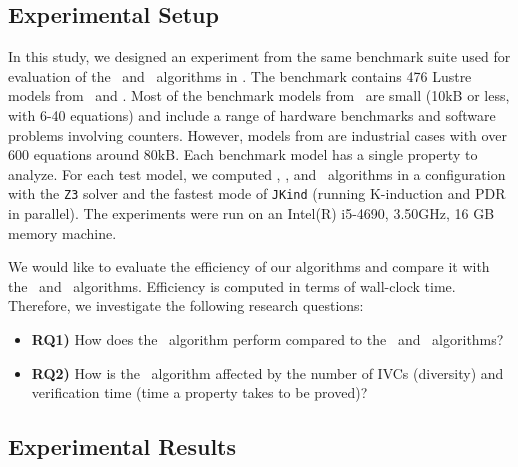 
\newcommand{\takeaway}[1]{
\vspace{6pt}
\noindent\fbox{\parbox{\textwidth}{#1}}
\vspace{6pt}
}
\subsection{Experimental Setup}
 In this study, we designed an experiment from
 the same benchmark suite used for evaluation of the \ucalg ~and \ucbfalg ~algorithms in \cite{Ghass16}.
 The benchmark contains 476 Lustre models
 from~\cite{Hagen08:FMCAD} and \cite{QFCS15:backes,hilt2013}.
 Most of
the benchmark models from~\cite{Hagen08:FMCAD} are small (10kB or less,
with 6-40 equations) and include a range of hardware benchmarks and
software problems involving counters.
However, models from \cite{QFCS15:backes,hilt2013} are industrial cases with over 600 equations around 80kB.
Each benchmark model has a single property to analyze.
For each test model, we computed \aivcalg , \ucalg , and \ucbfalg ~algorithms
in a configuration with
the \texttt{Z3} solver and the fastest mode of \texttt{JKind} (running K-induction and PDR in parallel). The experiments
were run on an  Intel(R) i5-4690, 3.50GHz,
16 GB memory machine.

We would like to evaluate the efficiency
 of our algorithms and compare it with the \ucalg ~and \ucbfalg ~algorithms.
 Efficiency is computed in terms of wall-clock time. Therefore, we investigate the following research questions:
\begin{itemize}
  \item \textbf{RQ1)} How does the \aivcalg ~algorithm perform compared to the \ucalg ~and \ucbfalg ~algorithms?
  \item \textbf{RQ2)} How is the \aivcalg ~algorithm affected by the number of IVCs (diversity) and verification time (time a property takes to be proved)?
%
\end{itemize}


\subsection{Experimental Results}

 